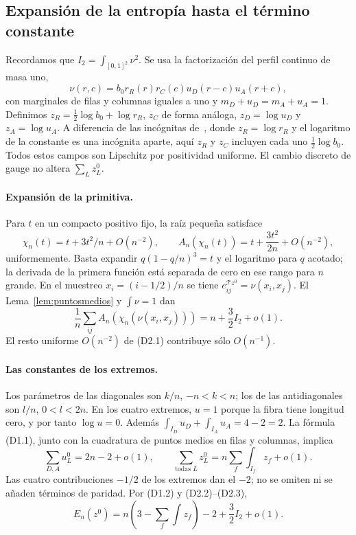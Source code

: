\subsection{Expansión de la entropía hasta el término constante}\label{sec:D02}
Recordamos que $I_2=\int_{[0,1]^2}\nu^2$.
Se usa la factorización del perfil continuo de masa uno,
\[
 \nu(r,c)=b_0 r_R(r)r_C(c)u_D(r-c)u_A(r+c),
\]
con marginales de filas y columnas iguales a uno y $m_D+u_D=m_A+u_A=1$.
Definimos $z_R=\tfrac12\log b_0+\log r_R$, $z_C$ de forma análoga,
$z_D=\log u_D$ y $z_A=\log u_A$.
A diferencia de las incógnitas de~\cite[Sección~5]{Perfil}, donde $z_R=\log r_R$ y el logaritmo
de la constante es una incógnita aparte, aquí $z_R$ y $z_C$ incluyen cada uno $\tfrac12\log b_0$.
Todos estos campos son Lipschitz por positividad uniforme.
El cambio discreto de gauge no altera $\sum_Lz_L^0$.

\paragraph{Expansión de la primitiva.}
Para $t$ en un compacto positivo fijo, la raíz pequeña satisface
\[
 \chi_n(t)=t+3t^2/n+O(n^{-2}),\qquad
 A_n(\chi_n(t))=t+\frac{3t^2}{2n}+O(n^{-2}),          \tag{D2.1}
\]
uniformemente. Basta expandir $q(1-q/n)^3=t$ y el logaritmo
para $q$ acotado; la derivada de la primera función está separada
de cero en ese rango para $n$ grande.
En el muestreo $x_i=(i-1/2)/n$ se tiene $e^{\mathcal Tz^0}_{ij}=\nu(x_i,x_j)$.
El Lema~\ref{lem:puntosmedios} y $\int\nu=1$ dan
\[
 \frac1n\sum_{ij}A_n(\chi_n(\nu(x_i,x_j)))
      =n+\frac32 I_2+o(1).                         \tag{D2.2}
\]
El resto uniforme $O(n^{-2})$ de (D2.1) contribuye sólo $O(n^{-1})$.

\paragraph{Las constantes de los extremos.}
Los parámetros de las diagonales son $k/n$, $-n<k<n$; los de las antidiagonales son $l/n$,
$0<l<2n$. En los cuatro extremos, $u=1$ porque la fibra tiene
longitud cero, y por tanto $\log u=0$.
Además $\int_{I_D}u_D+\int_{I_A}u_A=4-2=2$.
La fórmula (D1.1), junto con la cuadratura de puntos medios en filas y columnas, implica
\[
 \sum_{D,A}u_L^0=2n-2+o(1),\qquad
 \sum_{\text{todas }L}z_L^0=n\sum_f\int_{I_f}z_f+o(1).   \tag{D2.3}
\]
Las cuatro contribuciones $-1/2$ de los extremos dan el $-2$;
no se omiten ni se añaden términos de paridad.
Por (D1.2) y (D2.2)--(D2.3),
\[
 E_n(z^0)=n\left(3-\sum_f\int z_f\right)-2
                                    +\frac32I_2+o(1).    \tag{D2.4}
\]

